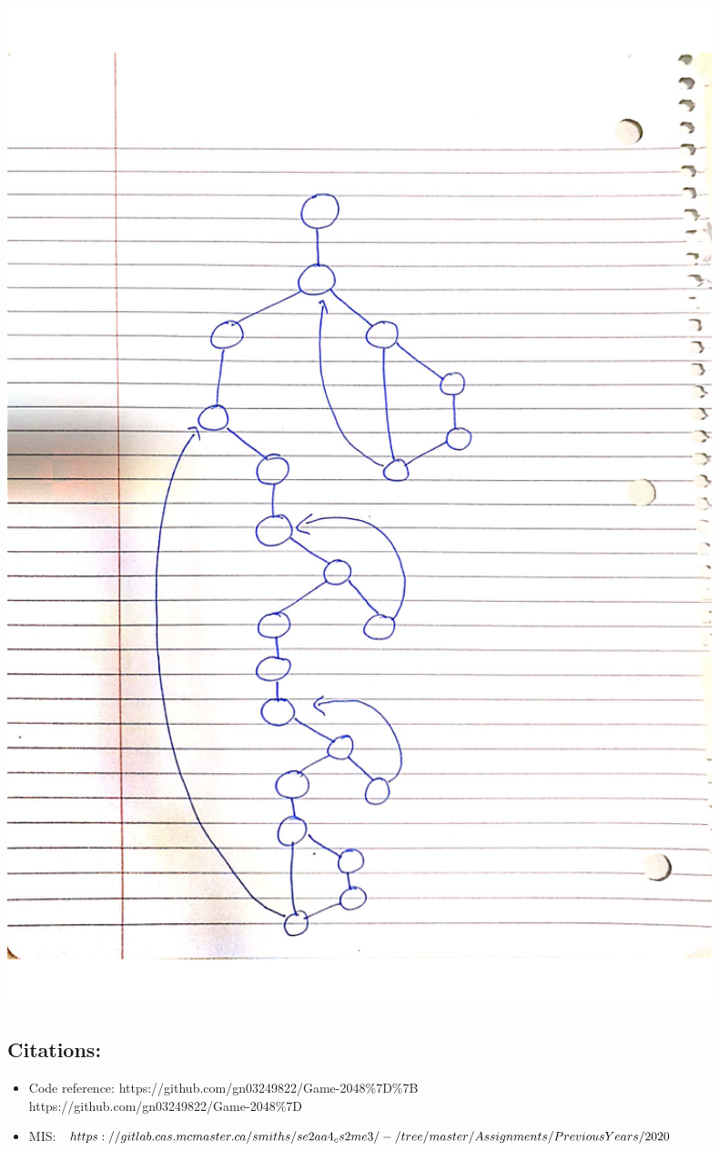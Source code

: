 \documentclass[12pt]{article}
\begin{document}
\begin{center}
\includegraphics[width=0.9\textwidth]{flow.png}
\end{center}

\subsection* {Citations:}
\begin{itemize}
\item Code reference: https://github.com/gn03249822/Game-2048\%7D\%7B\\https://github.com/gn03249822/Game-2048\%7D
\item MIS: $https://gitlab.cas.mcmaster.ca/smiths/se2aa4_cs2me3/-/tree/master/\\Assignments/PreviousYears/2020$
\end{itemize}
\end{document}
